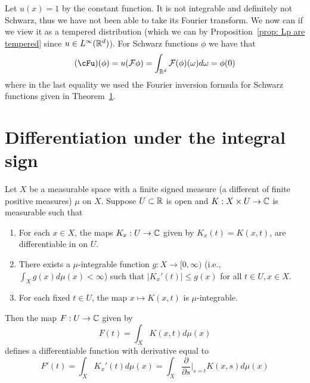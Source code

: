 \documentclass[twoside, a4paper, 10pt]{amsart}
\begin{document}
\begin{eg} Let $u(x) = 1$ by the constant function. It is not integrable and definitely not Schwarz, thus we have not been able to take its Fourier transform. We now can if we view it as a tempered distribution (which we can by Proposition~\ref{prop: Lp are tempered}  since $u \in L^{\infty}(\mathbb{R}^d)$). For Schwarz functions $\phi$ we have that $$(\cFu)(\phi) = u(\cF \phi) = \int_{\bR^d} \cF(\phi)(\omega) d\omega = \phi(0)$$ where in the last equality we used the Fourier inversion formula for Schwarz functions given in Theorem~\ref{}. 

\end{eg}






















\appendix

\section{Differentiation under the integral sign}

\begin{prop} \label{prop: diff under int} Let $X$ be a measurable space with a finite signed measure (a different of finite positive measures) $\mu$ on $X$. Suppose $U \subset \mathbb{R}$ is open and $K:X \times U \to \mathbb{C}$ is measurable such that

\begin{enumerate}
	\item For each $x \in X$, the maps $K_x:U \to \mathbb{C}$ given by $K_x(t) = K(x,t)$, are differentiable in on $U$. 
	\item There exists a $\mu$-integrable function $g:X \to [0,\infty)$ (i.e., $\int_X g(x) d\mu(x) < \infty$) such that $|K_x'(t)| \leq g(x)$ for all $t \in U, x \in X$.
	\item For each fixed $t \in U$, the map $x \mapsto K(x,t)$ is $\mu$-integrable.
\end{enumerate}

Then the map $F:U \to \mathbb{C}$ given by $$F(t) = \int_{X} K(x,t) d\mu(x)$$ defines a differentiable function with derivative equal to $$F'(t) = \int_X K_x'(t) d\mu(x) = \int_X \frac{\partial}{\partial s}|_{s = t} K(x,s) d\mu(x)$$

\end{prop}
\end{document}
